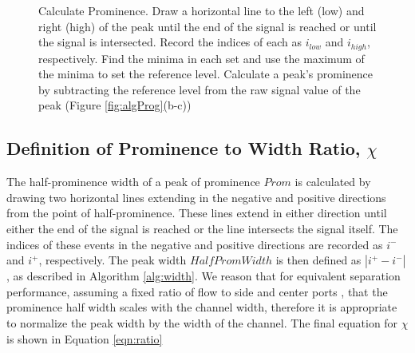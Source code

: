 \begin{figure}
\begin{algorithm}[H]
\DontPrintSemicolon
{}
\caption{\label{alg:prom}Calculate Prominence. Draw a horizontal line to the left (low) and right (high) of the peak until the end of the signal is reached or until the signal is intersected. Record the indices of each as $i_{low}$ and $i_{high}$, respectively. Find the minima in each set and use the maximum of the minima to set the reference level. Calculate a peak's prominence by subtracting the reference level from the raw signal value of the peak (Figure \ref{fig:algProg}(b-c))}
\end{algorithm}
\end{figure}

\subsection{Definition of Prominence to Width Ratio, $\chi$}
\label{ssec:promToWidth}
The half-prominence width of a peak of prominence $Prom$ is calculated by drawing two horizontal lines extending in the negative and positive directions from the point of half-prominence. These lines extend in either direction until either the end of the signal is reached or the line intersects the signal itself. The indices of these events in the negative and positive directions are recorded as $i^-$ and $i^+$, respectively. The peak width $HalfPromWidth$ is then defined as $|i^+-i^-|$, as described in Algorithm \ref{alg:width}. We reason that for equivalent separation performance, assuming a fixed ratio of flow to side and center ports \cite{ley2016continuum}, that the prominence half width scales with the channel width, therefore it is appropriate to normalize the peak width by the width of the channel. The final equation for $\chi$ is shown in Equation \ref{eqn:ratio}

